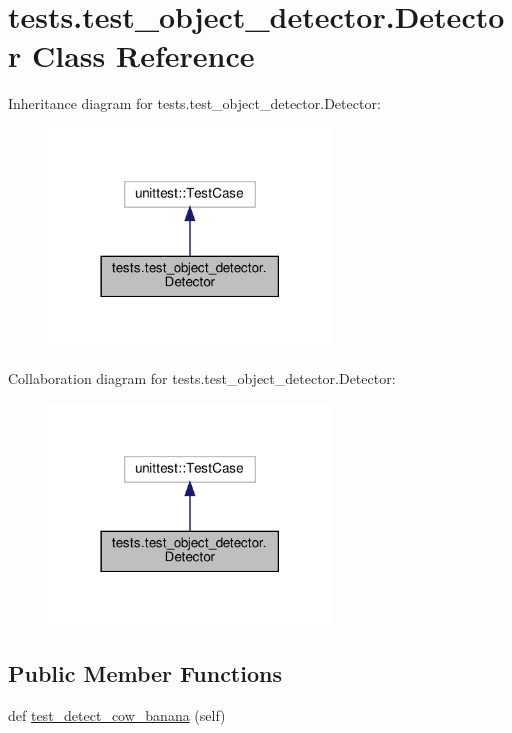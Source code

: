 \hypertarget{classtests_1_1test__object__detector_1_1Detector}{}\section{tests.\+test\+\_\+object\+\_\+detector.\+Detector Class Reference}
\label{classtests_1_1test__object__detector_1_1Detector}


Inheritance diagram for tests.\+test\+\_\+object\+\_\+detector.\+Detector\+:\nopagebreak
\begin{figure}[H]
\begin{center}
\leavevmode
\includegraphics[width=213pt]{classtests_1_1test__object__detector_1_1Detector__inherit__graph}
\end{center}
\end{figure}


Collaboration diagram for tests.\+test\+\_\+object\+\_\+detector.\+Detector\+:\nopagebreak
\begin{figure}[H]
\begin{center}
\leavevmode
\includegraphics[width=213pt]{classtests_1_1test__object__detector_1_1Detector__coll__graph}
\end{center}
\end{figure}
\subsection*{Public Member Functions}
\begin{DoxyCompactItemize}
\item 
def \hyperlink{classtests_1_1test__object__detector_1_1Detector_afa15ba2941421016d69736377f867233}{test\+\_\+detect\+\_\+cow\+\_\+banana} (self)
\end{DoxyCompactItemize}


